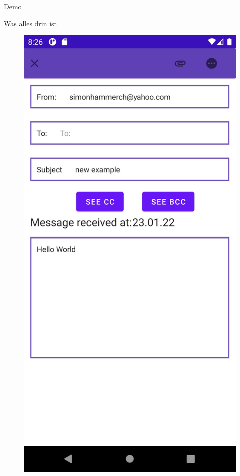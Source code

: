 \documentclass[aspectratio=169]{beamer}
\begin{document}
\begin{frame}{Demo}
    \begin{figure}[h]
        \centering
    \end{figure}
\end{frame}

\begin{frame}{Was alles drin ist}

    \begin{figure}[h]

        \includegraphics[height=.8\textheight]{media/emailViewer.jpg}

\end{figure}
\end{frame}
\end{document}
